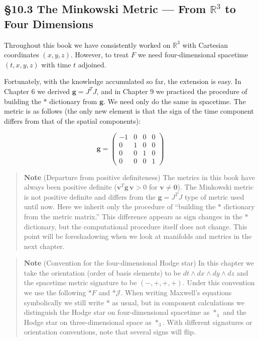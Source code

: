 \documentclass[a4paper,12pt,openany]{book}
\begin{document}
\par\vspace{0.35em}\par

\hypertarget{the-minkowski-metric-from-mathbbr3-to-four-dimensions}{%
\subsection{\texorpdfstring{§10.3 The Minkowski Metric — From
\(\mathbb{R}^3\) to Four
Dimensions}{§10.3 The Minkowski Metric — From \textbackslash mathbb\{R\}\^{}3 to Four Dimensions}}\label{the-minkowski-metric-from-mathbbr3-to-four-dimensions}}

Throughout this book we have consistently worked on \(\mathbb{R}^3\)
with Cartesian coordinates \((x,y,z)\). However, to treat \(F\) we need
four-dimensional spacetime \((t,x,y,z)\) with time \(t\) adjoined.

Fortunately, with the knowledge accumulated so far, the extension is
easy. In Chapter 6 we derived \(\mathbf{g} = J^T J\), and in Chapter 9
we practiced the procedure of building the \(\ast\) dictionary from
\(\mathbf{g}\). We need only do the same in spacetime. The metric is as
follows (the only new element is that the sign of the time component
differs from that of the spatial components):

\[\mathbf{g} = \begin{pmatrix}
-1 & 0 & 0 & 0 \\
0 & 1 & 0 & 0 \\
0 & 0 & 1 & 0 \\
0 & 0 & 0 & 1
\end{pmatrix}\]

\begin{quote}
\textbf{Note} (Departure from positive definiteness) The metrics in this
book have always been positive definite
(\(\mathbf{v}^T\mathbf{g}\,\mathbf{v} > 0\) for
\(\mathbf{v}\neq\mathbf{0}\)). The Minkowski metric is not positive
definite and differs from the \(\mathbf{g}=J^T J\) type of metric used
until now. Here we inherit only the procedure of ``building the \(\ast\)
dictionary from the metric matrix.'' This difference appears as sign
changes in the \(\ast\) dictionary, but the computational procedure
itself does not change. This point will be foreshadowing when we look at
manifolds and metrics in the next chapter.
\end{quote}

\begin{quote}
\textbf{Note} (Convention for the four-dimensional Hodge star) In this
chapter we take the orientation (order of basis elements) to be
\(dt\wedge dx\wedge dy\wedge dz\) and the spacetime metric signature to
be \((-,+,+,+)\). Under this convention we use the following \(\ast F\)
and \(\ast\mathcal{J}\). When writing Maxwell's equations symbolically
we still write \(\ast\) as usual, but in component calculations we
distinguish the Hodge star on four-dimensional spacetime as \(\ast_4\)
and the Hodge star on three-dimensional space as \(\ast_3\). With
different signatures or orientation conventions, note that several signs
will flip.
\end{quote}
\end{document}
